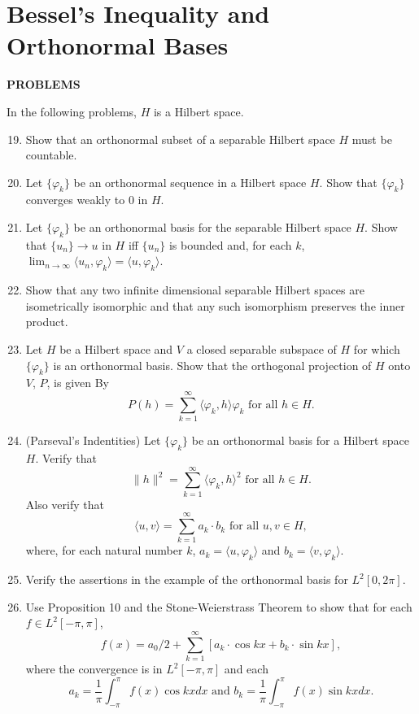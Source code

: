 \section{Bessel's Inequality and Orthonormal Bases}
\begin{center}
	\textbf{PROBLEMS}
\end{center}
In the following problems, $H$ is a Hilbert space.
\begin{enumerate}
	\setcounter{enumi}{18}
    \item Show that an orthonormal subset of a separable Hilbert space $H$ must be countable.
    \item Let $\{\varphi_k\}$ be an orthonormal sequence in a Hilbert space $H$. Show that $\{\varphi_k\}$ converges weakly to $0$ in $H$.
    \item Let $\{\varphi_k\}$ be an orthonormal basis for the separable Hilbert space $H$. Show that $\{u_n\}\to u$ in $H$ iff $\{u_n\}$ is bounded and, for each $k$, $\lim_{n\to\infty}\langle u_n,\varphi_k\rangle=\langle u,\varphi_k\rangle$.
    \item Show that any two infinite dimensional separable Hilbert spaces are isometrically isomorphic and that any such isomorphism preserves the inner product.
    \item Let $H$ be a Hilbert space and $V$ a closed separable subspace of $H$ for which $\{\varphi_k\}$ is an orthonormal basis.
    Show that the orthogonal projection of $H$ onto $V$, $P$, is given By
    \[
        P(h)=\sum_{k=1}^\infty \langle \varphi_k,h\rangle\varphi_k\text{ for all }h\in H.  
    \] 
    \item (Parseval's Indentities) Let $\{\varphi_k\}$ be an orthonormal basis for a Hilbert space $H$. Verify that
    \[
        \|h\|^2=\sum_{k=1}^\infty\langle \varphi_k,h\rangle^2\text{ for all }h\in H.
    \]
    Also verify that
    \[
        \langle u,v\rangle =  \sum_{k=1}^\infty a_k \cdot b_k\text{ for all }u,v\in H,
    \]
    where, for each natural number $k$, $a_k=\langle u,\varphi_k\rangle$ and $b_k=\langle v,\varphi_k\rangle$.
    \item Verify the assertions in the example of the orthonormal basis for $L^2[0,2\pi]$.
    \item Use Proposition 10 and the Stone-Weierstrass Theorem to show that for each $f\in L^2[-\pi,\pi]$,
    \[
        f(x)=a_0/2+\sum_{k=1}^\infty[a_k\cdot\cos kx+b_k\cdot\sin kx],  
    \]
    where the convergence is in $L^2[-\pi,\pi]$ and each 
    \[
        a_k=\frac{1}{\pi}\int_{-\pi}^\pi f(x)\cos kxdx\text{ and }b_k=\frac{1}{\pi}\int_{-\pi}^\pi f(x)\sin kxdx.
    \]
\end{enumerate}

